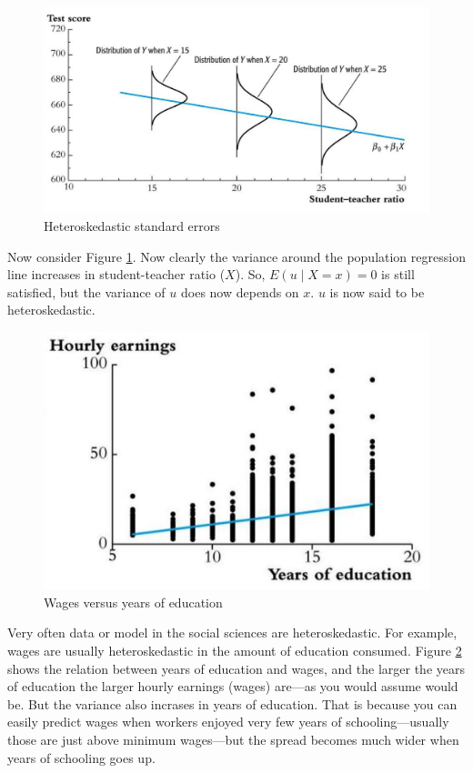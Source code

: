 \documentclass[
]{book}
\begin{document}
\begin{figure}
\includegraphics[width=20.07in]{./figures/Sheet22} \caption{Heteroskedastic standard errors}\label{fig:heteroskedasticity}
\end{figure}

Now consider Figure \ref{fig:heteroskedasticity}. Now clearly the variance around the population regression line increases in student-teacher ratio (\(X\)). So, \(E(u \mid X=x) = 0\) is still satisfied, but the variance of \(u\) does now depends on \(x\). \(u\) is now said to be heteroskedastic.

\begin{figure}
\includegraphics[width=13.56in]{./figures/Sheet23} \caption{Wages versus years of education}\label{fig:wages}
\end{figure}

Very often data or model in the social sciences are heteroskedastic. For example, wages are usually heteroskedastic in the amount of education consumed. Figure \ref{fig:wages} shows the relation between years of education and wages, and the larger the years of education the larger hourly earnings (wages) are---as you would assume would be. But the variance also incrases in years of education. That is because you can easily predict wages when workers enjoyed very few years of schooling---usually those are just above minimum wages---but the spread becomes much wider when years of schooling goes up.
\end{document}
